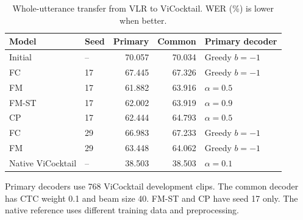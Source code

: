 \begin{table}[tbp]
\centering\small
\caption{Whole-utterance transfer from VLR to ViCocktail. WER (\%) is lower when better.}
\label{tab:vi}
\begin{tabular}{llrrl}
\toprule
Model & Seed & Primary & Common & Primary decoder \\
\midrule
Initial & -- & 70.057 & 70.034 & Greedy $b=-1$ \\
FC & 17 & 67.445 & 67.326 & Greedy $b=-1$ \\
FM & 17 & 61.882 & 63.916 & $\alpha=0.5$ \\
FM-ST & 17 & 62.002 & 63.919 & $\alpha=0.9$ \\
CP & 17 & 62.444 & 64.793 & $\alpha=0.5$ \\
FC & 29 & 66.983 & 67.233 & Greedy $b=-1$ \\
FM & 29 & 63.448 & 64.062 & Greedy $b=-1$ \\
Native ViCocktail & -- & 38.503 & 38.503 & $\alpha=0.1$ \\
\bottomrule
\end{tabular}
\par\smallskip\begin{minipage}{\linewidth}\footnotesize Primary decoders use 768 ViCocktail development clips. The common decoder has CTC weight 0.1 and beam size 40. FM-ST and CP have seed 17 only. The native reference uses different training data and preprocessing.
\end{minipage}
\end{table}
